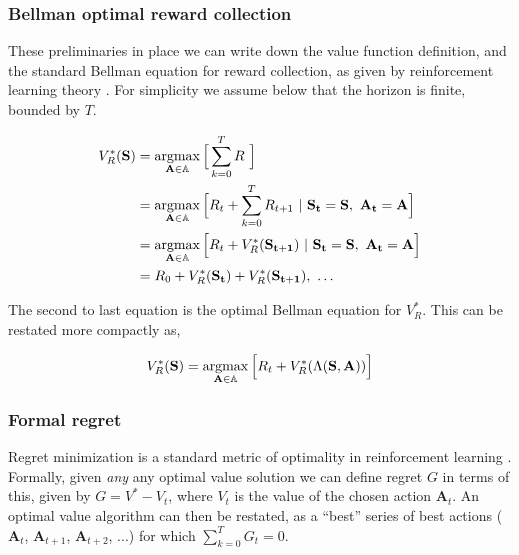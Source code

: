 \subsubsection*{Bellman optimal reward collection}
These preliminaries in place we can write down the value function definition, and the standard Bellman equation \cite{Bellmann1954} for reward collection, as given by reinforcement learning theory \citep{Sutton2018}. For simplicity we assume below that the horizon is finite, bounded by $T$.

\begin{equation} 
	\label{eq:bellman_seq}
    \begin{split}
        V^*_{R}(\mathbf{S}) &= \argmax_{\mathbf{A} \in \mathbb{A}} \Big [\sum_{k=0}^{T}  R \ \Big ]\\
                         	&= \argmax_{\mathbf{A} \in \mathbb{A}} \Big [ R_{t} + \sum_{k=0}^{T} R_{t+1} \ | \ \mathbf{S_t} = \mathbf{S},\ \mathbf{A_t} = \mathbf{A} \Big ]\\
							&= \argmax_{\mathbf{A} \in \mathbb{A}} \Big [ R_{t} + V^*_{R}(\mathbf{S_{t+1}}) \ | \ \mathbf{S_t} = \mathbf{S},\ \mathbf{A_t} = \mathbf{A} \Big ]\\
                         	&= R_0 + V^*_{R}(\mathbf{S_{t}}) + V^*_{R}(\mathbf{S_{t+1}}),\ \ldots
    \end{split}
\end{equation}

The second to last equation is the optimal Bellman equation for $V^*_R$. This can be restated more compactly as,

\begin{equation} 
\label{eq:bellman_iter}
V^*_R(\mathbf{S}) = \operatorname*{argmax}_{\mathbf{A} \in \mathbb{A}} \Big [ R_{t}  + V^*_{R}(\Lambda(\mathbf{S},\mathbf{A})) \Big ]
\end{equation}

\subsubsection*{Formal regret}
Regret minimization is a standard metric of optimality in reinforcement learning \citep{Sutton2018}. Formally, given \emph{any} any optimal value solution we can define regret $G$ in terms of this, given by $G = V^* - V_t$, where $V_t$ is the value of the chosen action $\mathbf{A}_t$. An optimal value algorithm can then be restated, as a ``best'' series of best actions ($\mathbf{A}_t$, $\mathbf{A}_{t+1}$, $\mathbf{A}_{t+2}$, ...) for which $\sum_{k=0}^{T} G_t = 0$.

